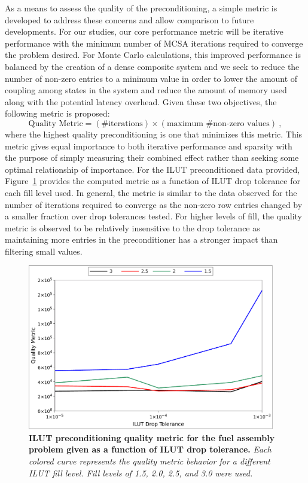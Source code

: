 As a means to assess the quality of the preconditioning, a simple
metric is developed to address these concerns and allow comparison to
future developments. For our studies, our core performance metric will
be iterative performance with the minimum number of MCSA iterations
required to converge the problem desired. For Monte Carlo
calculations, this improved performance is balanced by the creation of
a dense composite system and we seek to reduce the number of non-zero
entries to a minimum value in order to lower the amount of coupling
among states in the system and reduce the amount of memory used along
with the potential latency overhead. Given these two objectives, the
following metric is proposed:
\begin{equation}
  \text{Quality Metric} = (\text{\# iterations}) \times (\text{maximum
    \# non-zero values})\:,
\end{equation}
where the highest quality preconditioning is one that minimizes this
metric. This metric gives equal importance to both iterative
performance and sparsity with the purpose of simply measuring their
combined effect rather than seeking some optimal relationship of
importance. For the ILUT preconditioned data provided,
Figure~\ref{fig:ilut_quality} provides the computed metric as a
function of ILUT drop tolerance for each fill level used. In general,
the metric is similar to the data observed for the number of
iterations required to converge as the non-zero row entries changed by
a smaller fraction over drop tolerances tested. For higher levels of
fill, the quality metric is observed to be relatively insensitive to
the drop tolerance as maintaining more entries in the preconditioner
has a stronger impact than filtering small values.

\begin{figure}[t!]
  \begin{center}
    \includegraphics[width=4.25in]{chapters/spn_equations/ilut_quality.pdf}
  \end{center}
  \caption{\textbf{ILUT preconditioning quality metric for the fuel
      assembly problem given as a function of ILUT drop tolerance.}
    \textit{Each colored curve represents the quality metric behavior
      for a different ILUT fill level. Fill levels of 1.5, 2.0, 2.5,
      and 3.0 were used.}}
  \label{fig:ilut_quality}
\end{figure}


